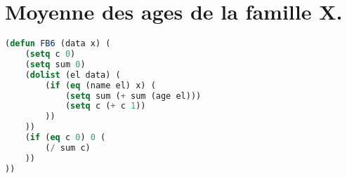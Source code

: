 \documentclass[a4paper, 12pt, leqno]{report}
\theoremstyle{plain}
\begin{document}
           \section{Moyenne des ages de la famille X.}
        
            \begin{lstlisting}[label=some-code,caption=FB6(data X),language=lisp]
                (defun FB6 (data x) (
    (setq c 0)
    (setq sum 0)
    (dolist (el data) (
        (if (eq (name el) x) (
            (setq sum (+ sum (age el)))
            (setq c (+ c 1))
        ))
    ))
    (if (eq c 0) 0 (
        (/ sum c)
    ))
))
            \end{lstlisting}                 
\end{document}
